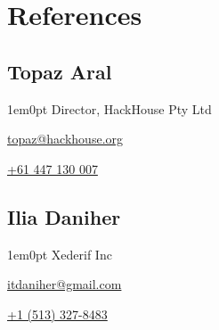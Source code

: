 \documentclass{../styles/cv}
\begin{document}
\section{References}

\subsection[Topaz Aral]{\textbf{Topaz Aral}}
\begin{adjustwidth}{1em}{0pt}
    Director, HackHouse Pty Ltd
    
    \href{mailto:topaz@hackhouse.org}{topaz@hackhouse.org}
    
    \href{tel:+61447130007}{+61 447 130 007}
\end{adjustwidth}

\subsection[Ilia Daniher]{\textbf{Ilia Daniher}}
\begin{adjustwidth}{1em}{0pt}
    Xederif Inc
    
    \href{mailto:itdaniher@gmail.com}{itdaniher@gmail.com}
    
    \href{tel:+15133278483}{+1 (513) 327-8483}
\end{adjustwidth}
\end{document}
